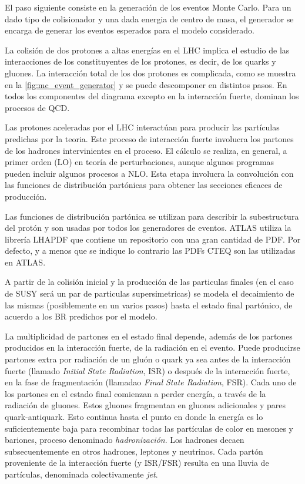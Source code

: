 El paso siguiente consiste en la generación de los eventos Monte Carlo.
Para un dado tipo de colisionador y una dada energia de centro de masa,
el generador se encarga de generar los eventos esperados para el modelo
considerado.

La colisión de dos protones a altas energías en el LHC implica el estudio de las
interacciones de los constituyentes de los protones, es decir, de los quarks y
gluones. La interacción total de los dos protones es complicada, como se muestra
en la \cref{fig:mc_event_generator} y se puede descomponer en distintos pasos.
En todos los componentes del diagrama excepto en la interacción fuerte, dominan los procesos de QCD.

Las protones aceleradas por el LHC interactúan para producir las partículas
predichas por la teoria. Este proceso de interacción fuerte involucra los
partones de los hadrones intervinientes en el proceso. El cálculo se realiza, en
general, a primer orden (LO) en teoría de perturbaciones, aunque algunos
programas pueden incluir algunos procesos a NLO. Esta etapa involucra la
convolución con las funciones de distribución partónicas para obtener las
secciones eficaces de producción.

Las funciones de distribución partónica se utilizan para describir la
subestructura del protón y son usadas por todos los generadores de eventos.
ATLAS utiliza la librería LHAPDF \cite{Bourilkov:2006cj} que contiene un
repositorio con una gran
cantidad de PDF. Por defecto, y a menos que se indique lo contrario las PDFs
CTEQ \cite{Nadolsky:2008zw} son las utilizadas en ATLAS.

A partir de la colisión inicial y la producción de las particulas finales (en el
caso de SUSY será un par de particulas supersimetricas) se
modela el decaimiento de las mismas (posiblemente en un varios pasos) hasta el
estado final partónico, de acuerdo a los BR predichos por el modelo.

La multiplicidad de partones en el estado final depende, además de los partones producidos en la interacción
fuerte, de la radiación en el evento. Puede producirse partones extra por
radiación de un gluón o quark ya sea antes de la interacción fuerte (llamado
\emph{Initial State Radiation}, ISR) o después de la interacción fuerte, en la fase de
fragmentación (llamadao \emph{Final State Radiation}, FSR).
Cada uno de los partones en el estado
final comienzan a perder energía, a través de la radiación de gluones. Estos
gluones fragmentan en gluones adicionales y pares quark-antiquark. Esto continua
hasta el punto en donde la energía es lo suficientemente baja para recombinar
todas las partículas de color en mesones y bariones, proceso denominado
\emph{hadronización}. Los hadrones decaen subsecuentemente en otros hadrones,
leptones y neutrinos. Cada partón proveniente de la interacción fuerte (y
ISR/FSR) resulta en una lluvia de partículas, denominada colectivamente
\emph{jet}.


